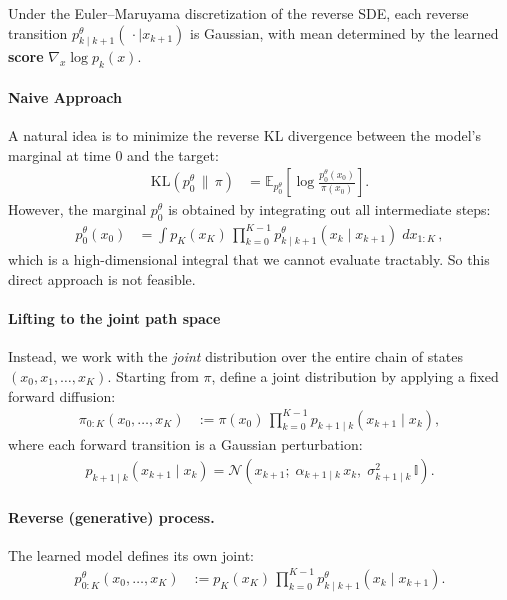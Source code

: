 Under the Euler--Maruyama discretization of the reverse SDE, each reverse transition $p^\theta_{k\mid k+1}(\,\cdot\mid x_{k+1})$ is Gaussian, with mean determined by the learned \textbf{score} $\nabla_{x}\log p_k(x)$.

\paragraph{Naive Approach}

A natural idea is to minimize the reverse KL divergence between the model's marginal at time $0$ and the target:
\begin{align}
    \text{KL}(p^\theta_0 \,\big\|\, \pi )
    &= \mathbb E_{p^\theta_0}\!\left[\log \frac{p^\theta_0(x_0)}{\pi(x_0)}\right].
\end{align}
However, the marginal $p^\theta_0$ is obtained by integrating out all intermediate steps:
\begin{align}
    p^\theta_0(x_0)
    &= \int p_K(x_K)\,\prod_{k=0}^{K-1} p^\theta_{k\mid k+1}(x_k \mid x_{k+1})\; dx_{1:K}\,,
\end{align}
which is a high-dimensional integral that we cannot evaluate tractably. So this direct approach is not feasible.

\paragraph{Lifting to the joint path space}

Instead, we work with the \emph{joint} distribution over the entire chain of states $(x_0, x_1, \dots, x_K)$. Starting from $\pi$, define a joint distribution by applying a fixed forward diffusion:
\begin{align}
    \pi_{0:K}(x_0, \dots, x_K)
    &:= \pi(x_0)\,\prod_{k=0}^{K-1} p_{k+1\mid k}(x_{k+1}\mid x_k),
\end{align}
where each forward transition is a Gaussian perturbation:
\begin{align}
    p_{k+1\mid k}(x_{k+1}\mid x_k) = \mathcal N\!(x_{k+1};\; \alpha_{k+1\mid k}\, x_k,\;\sigma^2_{k+1\mid k}\,\mathbb I ).
\end{align}

\paragraph{Reverse (generative) process.}
The learned model defines its own joint:
\begin{align}
    p^\theta_{0:K}(x_0, \dots, x_K)
    &:= p_K(x_K)\,\prod_{k=0}^{K-1} p^\theta_{k\mid k+1}(x_k \mid x_{k+1}).
\end{align}

